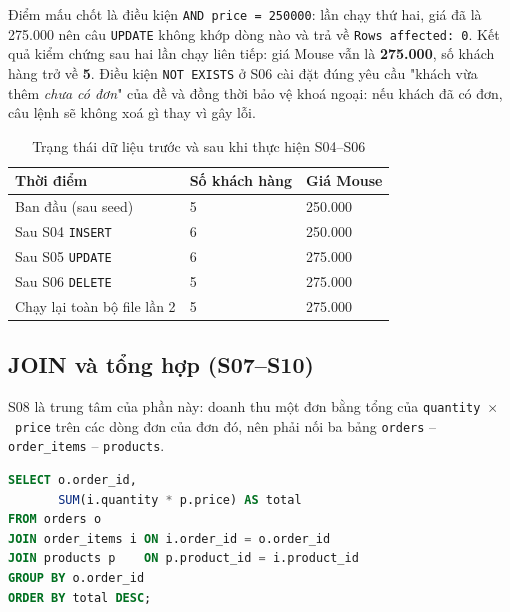 \documentclass[12pt,a4paper]{article}
\newcommand{\code}[1]{\texttt{\small #1}}
\begin{document}
Điểm mấu chốt là điều kiện \code{AND price = 250000}: lần chạy thứ hai, giá đã là 275.000 nên
câu \code{UPDATE} không khớp dòng nào và trả về \code{Rows affected: 0}. Kết quả kiểm chứng sau
hai lần chạy liên tiếp: giá Mouse vẫn là \textbf{275.000}, số khách hàng trở về \textbf{5}. Điều
kiện \code{NOT EXISTS} ở S06 cài đặt đúng yêu cầu "khách vừa thêm \emph{chưa có đơn}" của đề và
đồng thời bảo vệ khoá ngoại: nếu khách đã có đơn, câu lệnh sẽ không xoá gì thay vì gây lỗi.

\begin{table}[H]
\centering
\caption{Trạng thái dữ liệu trước và sau khi thực hiện S04--S06}
\label{tab:crud}
\small
\begin{tabular}{@{}l l l@{}}
\toprule
\textbf{Thời điểm} & \textbf{Số khách hàng} & \textbf{Giá Mouse} \\
\midrule
Ban đầu (sau seed)          & 5 & 250.000 \\
Sau S04 \code{INSERT}       & 6 & 250.000 \\
Sau S05 \code{UPDATE}       & 6 & 275.000 \\
Sau S06 \code{DELETE}       & 5 & 275.000 \\
Chạy lại toàn bộ file lần 2 & 5 & 275.000 \\
\bottomrule
\end{tabular}
\end{table}

\subsection{JOIN và tổng hợp (S07--S10)}

S08 là trung tâm của phần này: doanh thu một đơn bằng tổng của
\code{quantity}~$\times$~\code{price} trên các dòng đơn của đơn đó, nên phải nối ba bảng
\code{orders} -- \code{order\_items} -- \code{products}.

\begin{lstlisting}[language=SQL,caption={S08 --- tổng tiền từng đơn hàng}]
SELECT o.order_id,
       SUM(i.quantity * p.price) AS total
FROM orders o
JOIN order_items i ON i.order_id = o.order_id
JOIN products p    ON p.product_id = i.product_id
GROUP BY o.order_id
ORDER BY total DESC;
\end{lstlisting}
\end{document}
